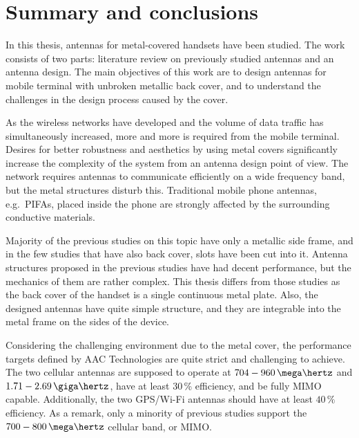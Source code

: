 \section{Summary and conclusions} 
\label{sec:conclusions}

\begin{comment}
\begin{itemize}
\item[--]yhteenveto mitä tehty
\item[--]päätulokset
\item[--]johtopäätökset
\item[--]oma arvio?
\end{itemize}
\end{comment}

In this thesis, antennas for metal-covered handsets have been studied. The work consists of two parts: literature review on previously studied antennas and an antenna design. The main objectives of this work are to design antennas for mobile terminal with unbroken metallic back cover, and to understand the challenges in the design process caused by the cover.

As the wireless networks have developed and the volume of data traffic has simultaneously increased, more and more is required from the mobile terminal. Desires for better robustness and aesthetics by using metal covers significantly increase the complexity of the system from an antenna design point of view. The network requires antennas to communicate efficiently on a wide frequency band, but the metal structures disturb this. Traditional mobile phone antennas, e.g.\ PIFAs, placed inside the phone are strongly affected by the surrounding conductive materials.

Majority of the previous studies on this topic have only a metallic side frame, and in the few studies that have also back cover, slots have been cut into it. Antenna structures proposed in the previous studies have had decent performance, but the mechanics of them are rather complex. This thesis differs from those studies as the back cover of the handset is a single continuous metal plate. Also, the designed antennas have quite simple structure, and they are integrable into the metal frame on the sides of the device.

Considering the challenging environment due to the metal cover, the performance targets defined by AAC Technologies are quite strict and challenging to achieve. The two cellular antennas are supposed to operate at $704-960\,\mega\hertz$ and $1.71-2.69\,\giga\hertz$, have at least 30\,\% efficiency, and be fully MIMO capable. Additionally, the two GPS/Wi-Fi antennas should have at least $40\,\%$ efficiency. As a remark, only a minority of previous studies support the $700-800\,\mega\hertz$ cellular band, or MIMO.

